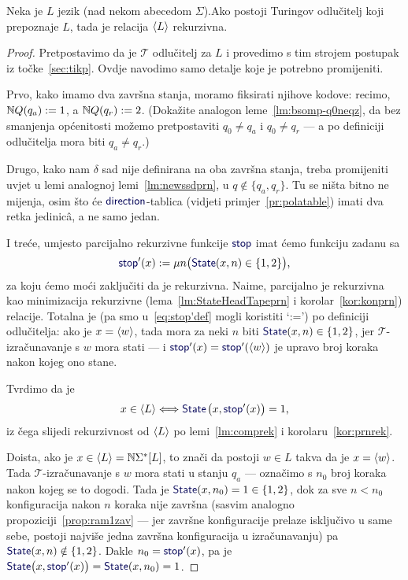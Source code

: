 \begin{teorem}[{name=[rekurzivnost Turing-odlučivog jezika]}]\label{tm:oikr}
    Neka je $L$ jezik (nad nekom abecedom $\Sigma$).\newline Ako postoji Turingov odlučitelj koji prepoznaje $L$, tada je relacija $\langle L\rangle$ rekurzivna.
\end{teorem}
\begin{proof}
Pretpostavimo da je $\mathcal T$ odlučitelj za $L$ i provedimo s tim strojem postupak iz točke~\ref{sec:tikp}. Ovdje navodimo samo detalje koje je potrebno promijeniti.

Prvo, kako imamo dva završna stanja, moramo fiksirati njihove kodove: recimo, ${\mathbb N} Q(q_a):=1$, a ${\mathbb N} Q(q_r):=2$. (Dokažite analogon leme~\ref{lm:bsomp-q0neqz}, da bez smanjenja općenitosti možemo pretpostaviti $q_0\ne q_a$ i $q_0\ne q_r$ --- a po definiciji odlučitelja mora biti $q_a\ne q_r$.)

    Drugo, kako nam $\delta$ sad nije definirana na oba završna stanja, treba promijeniti uvjet u lemi analognoj lemi~\ref{lm:newssdprn}, u $q\notin\{q_a,q_r\}$. Tu se ništa bitno ne mijenja, osim što će $\f{direction}$-tablica (vidjeti primjer~\ref{pr:polatable}) imati dva retka jedinicâ, a ne samo jedan.

I treće, umjesto parcijalno rekurzivne funkcije $\f{stop}$ imat ćemo funkciju zadanu sa
\begin{equation}\label{eq:stop'def}
    \f{stop}'(x):=\mu n\bigl(\f{State}(x,n)\in\{1,2\}\bigr)\text,
\end{equation}
	za koju ćemo moći zaključiti da je rekurzivna. Naime, parcijalno je rekurzivna kao minimizacija rekurzivne (lema~\ref{lm:StateHeadTapeprn} i korolar~\ref{kor:konprn}) relacije. Totalna je (pa smo u~\eqref{eq:stop'def} mogli koristiti \enquote*{:=}) po definiciji odlučitelja: ako je $x=\langle w\rangle$, tada mora za neki $n$ biti $\f{State}(x,n)\in\{1,2\}$, jer $\mathcal T$\!-izračunavanje s $w$ mora stati --- i $\f{stop}'(x)=\f{stop}'(\kr w)$ je upravo broj koraka nakon kojeg ono stane.

Tvrdimo da je
\begin{equation}
	x\in\kr L\Longleftrightarrow\f{State}\mspace{2mu}\bigl(x,\f{stop}'(x)\bigr)=1\text,
\end{equation}
iz čega slijedi rekurzivnost od $\langle L\rangle$ po lemi~\ref{lm:comprek} i korolaru~\ref{kor:prnrek}.

Doista, ako je $x\in\langle L\rangle={\mathbb N}\Sigma^*[L]$, to znači da postoji $w\in L$ takva da je $x=\langle w\rangle$. Tada $\mathcal T$\!-izračunavanje s $w$ mora stati u stanju $q_a$ --- označimo s $n_0$ broj koraka nakon kojeg se to dogodi. Tada je $\f{State}(x,n_0)=1\in\{1,2\}$, dok za sve $n<n_0$ konfiguracija nakon $n$ koraka nije završna (sasvim analogno propoziciji~\ref{prop:ram1zav} --- jer završne konfiguracije prelaze isključivo u same sebe, postoji najviše jedna završna konfiguracija u izračunavanju) pa $\f{State}(x,n)\notin\{1,2\}$. Dakle $n_0=\f{stop}'(x)$, pa je $\f{State}\bigl(x,\f{stop}'(x)\bigr)=\f{State}(x,n_0)=1$.


\end{proof}

